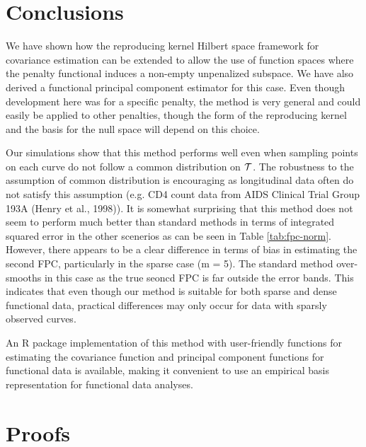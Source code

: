 \section{Conclusions} 

\label{sec:conclusions}

We have shown how the reproducing kernel Hilbert space framework for covariance estimation can be extended to allow the use of function spaces where the penalty functional induces a non-empty unpenalized subspace. We have also derived a functional principal component estimator for this case. Even though development here was for a specific penalty, the method is very general and could easily be applied to other penalties, though the form of the reproducing kernel and the basis for the null space will depend on this choice. 

Our simulations show that this method performs well even when sampling points on each curve do not follow a common distribution on $\mathcal{T}$. The robustness to the assumption of common distribution is encouraging as longitudinal data often do not satisfy this assumption (e.g. CD4 count data from AIDS Clinical Trial Group 193A (Henry et al., 1998)). It is somewhat surprising that this method does not seem to perform much better than standard methods in terms of integrated squared error in the other scenerios as can be seen in Table \ref{tab:fpc-norm}. However, there appears to be a clear difference in terms of bias in estimating the second FPC, particularly in the sparse case (m = 5). The standard method over-smooths in this case as the true seoncd FPC is far outside the error bands. This indicates that even though our method is suitable for both sparse and dense functional data, practical differences may only occur for data with sparsly observed curves.

An R package implementation of this method with user-friendly functions for estimating the covariance function and principal component functions for functional data is available, making it convenient to use an empirical basis representation for functional data analyses. 

\newpage
\section{Proofs} 

\label{sec:proofs}

